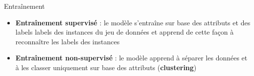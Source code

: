 \documentclass[compress]{beamer}
\begin{document}
\begin{frame}{Entraînement} \footnotesize
  \begin{figure}
  \centering
  \end{figure}
  \begin{itemize}
    \item<1-> \textbf{\color{fibeamer@orange}Entraînement supervisé} : le modèle s'entraîne sur base des attributs et des labels {\color{fibeamer@orange}labels} des instances du jeu de données et apprend de cette façon à reconnaître les labels des instances
    \item<2-> \textbf{\color{fibeamer@orange}Entraînement non-supervisé} : le modèle apprend à séparer les données et à les classer uniquement sur base des attributs (\textbf{\color{fibeamer@orange}clustering})
  \end{itemize}
\end{frame}
\end{document}
